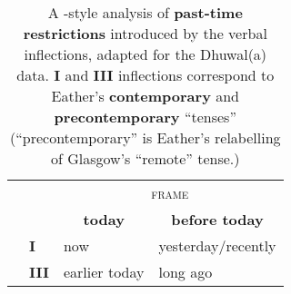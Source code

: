 \documentclass[11pt,dvipsnames]{article}
\begin{document}
\begin{itemize}
\begin{table}[H]
\begin{tabular}{@{}llll@{}}
			&                 & \multicolumn{2}{c}{\textsc{frame}}          \\ 
			&                 & \multicolumn{1}{c}{\textbf{today}}         & \multicolumn{1}{c}{\textbf{before today}}      \\\midrule
			\multirow{2}{*}{\textsc{\rotatebox[origin=c]{90}{infl}}} & \textbf{\phantom{I}I}    & now           & yesterday/recently \\
			& \textbf{III} & earlier today & long ago           \\ \bottomrule%
		\end{tabular}
		\caption{A \citet{Glasgow1964}-style analysis of \textbf{past-time restrictions} introduced by the verbal inflections, adapted for the Dhuwal(a) data. \textbf{I} and \textbf{III} inflections correspond to Eather's \textbf{contemporary} and \textbf{precontemporary} ``tenses'' (``precontemporary'' is Eather's \citeyearpar[166]{Eather2011} relabelling of Glasgow's ``remote'' tense.)}\label{GlaswegianTR}
	\end{table}
\end{itemize}
\end{document}
